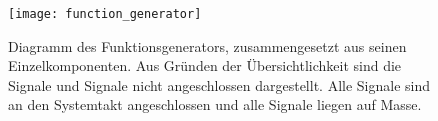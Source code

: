 \begin{figure}[h]
  \texttt{[image: function\_generator]}
  \caption{Diagramm des Funktionsgenerators, zusammengesetzt aus seinen Einzelkomponenten. Aus Gründen der Übersichtlichkeit sind die  Signale und  Signale nicht angeschlossen dargestellt. Alle  Signale sind an den Systemtakt angeschlossen und alle  Signale liegen auf Masse.}  \label{Concept:FuncGenDia}
\end{figure}

